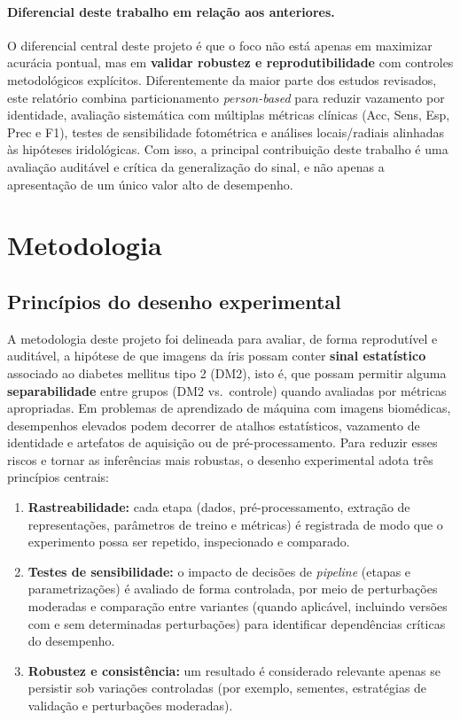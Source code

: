 \documentclass[11pt,a4paper]{article}
\begin{document}
\paragraph{Diferencial deste trabalho em relação aos anteriores.}
O diferencial central deste projeto é que o foco não está apenas em maximizar acurácia pontual, mas em \textbf{validar robustez e reprodutibilidade} com controles metodológicos explícitos. Diferentemente da maior parte dos estudos revisados, este relatório combina particionamento \textit{person-based} para reduzir vazamento por identidade, avaliação sistemática com múltiplas métricas clínicas (Acc, Sens, Esp, Prec e F1), testes de sensibilidade fotométrica e análises locais/radiais alinhadas às hipóteses iridológicas. Com isso, a principal contribuição deste trabalho é uma avaliação auditável e crítica da generalização do sinal, e não apenas a apresentação de um único valor alto de desempenho.

\section{Metodologia}

\subsection{Princípios do desenho experimental}
A metodologia deste projeto foi delineada para avaliar, de forma reprodutível e auditável, a hipótese de que imagens da íris possam conter \textbf{sinal estatístico} associado ao diabetes mellitus tipo 2 (DM2), isto é, que possam permitir alguma \textbf{separabilidade} entre grupos (DM2 vs.\ controle) quando avaliadas por métricas apropriadas. Em problemas de aprendizado de máquina com imagens biomédicas, desempenhos elevados podem decorrer de atalhos estatísticos, vazamento de identidade e artefatos de aquisição ou de pré-processamento. Para reduzir esses riscos e tornar as inferências mais robustas, o desenho experimental adota três princípios centrais:

\begin{enumerate}
    \item \textbf{Rastreabilidade:} cada etapa (dados, pré-processamento, extração de representações, parâmetros de treino e métricas) é registrada de modo que o experimento possa ser repetido, inspecionado e comparado.
    \item \textbf{Testes de sensibilidade:} o impacto de decisões de \textit{pipeline} (etapas e parametrizações) é avaliado de forma controlada, por meio de perturbações moderadas e comparação entre variantes (quando aplicável, incluindo versões com e sem determinadas perturbações) para identificar dependências críticas do desempenho.
    \item \textbf{Robustez e consistência:} um resultado é considerado relevante apenas se persistir sob variações controladas (por exemplo, sementes, estratégias de validação e perturbações moderadas).
\end{enumerate}
\end{document}
